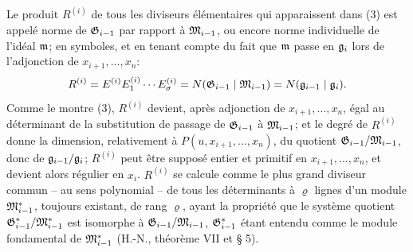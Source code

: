 Le produit $R^{(i)}$ de tous les diviseurs élémentaires qui apparaissent dans (3) est appelé norme de $\mathfrak G_{i-1}$ par rapport à $\mathfrak M_{i-1}$, ou encore norme individuelle de l'idéal $\mathfrak m$; en symboles, et en tenant compte du fait que $\mathfrak m$ passe en $\mathfrak g_i$ lors de l'adjonction de $x_{i+1},\ldots,x_n$:
\begin{equation}
 R^{(i)}=E^{(i)}E_1^{(i)}\cdots E_\sigma^{(i)}
 =N(\mathfrak G_{i-1}\mid\mathfrak M_{i-1})=N(\mathfrak g_{i-1}\mid\mathfrak g_i).
\end{equation}
Comme le montre (3), $R^{(i)}$ devient, après adjonction de $x_{i+1},\ldots,x_n$, égal au déterminant de la substitution de passage de $\mathfrak G_{i-1}$ à $\mathfrak M_{i-1}$; et le degré de $R^{(i)}$ donne la dimension, relativement à $P(u,x_{i+1},\ldots,x_n)$, du quotient $\mathfrak G_{i-1}/\mathfrak M_{i-1}$, donc de $\mathfrak g_{i-1}/\mathfrak g_i$; $R^{(i)}$ peut être supposé entier et primitif en $x_{i+1},\ldots,x_n$, et devient alors régulier en $x_i$. $R^{(i)}$ se calcule comme le plus grand diviseur commun -- au sens polynomial -- de tous les déterminants à $\varrho$ lignes d'un module $\mathfrak M^*_{i-1}$, toujours existant, de rang $\varrho$, ayant la propriété que le système quotient $\mathfrak G^*_{i-1}/\mathfrak M^*_{i-1}$ est isomorphe à $\mathfrak G_{i-1}/\mathfrak M_{i-1}$, $\mathfrak G^*_{i-1}$ étant entendu comme le module fondamental de $\mathfrak M^*_{i-1}$ (H.-N., théorème VII et \S{} 5).

